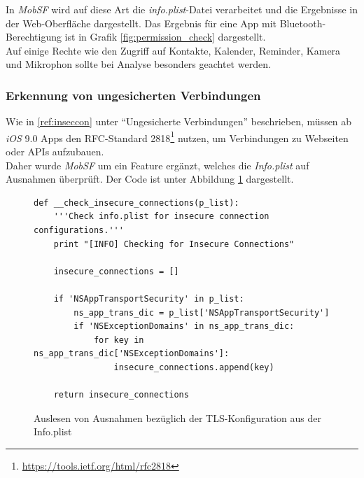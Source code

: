\pagebreak
In \textit{MobSF} wird auf diese Art die \textit{info.plist}-Datei verarbeitet und die Ergebnisse in der Web-Oberfläche dargestellt. Das Ergebnis für eine App mit Bluetooth-Berechtigung ist in Grafik \ref{fig:permission_check} dargestellt.\\

Auf einige Rechte wie den Zugriff auf Kontakte, Kalender, Reminder, Kamera und Mikrophon sollte bei Analyse besonders geachtet werden.

\subsubsection{Erkennung von ungesicherten Verbindungen}\label{ref:WeitMobSFErkennungVonUngesichertenVerbindungen}
Wie in \ref{ref:inseccon} unter "`Ungesicherte Verbindungen"' beschrieben, müssen ab \textit{iOS} 9.0 Apps den  RFC-Standard 2818\footnote{\url{https://tools.ietf.org/html/rfc2818}} nutzen, um Verbindungen zu Webseiten oder APIs aufzubauen.\\

Daher wurde \textit{MobSF} um ein Feature ergänzt, welches die \textit{Info.plist} auf Ausnahmen überprüft. Der Code ist unter Abbildung \ref{lis:NSAppTransportSecurity} dargestellt.\\

\begin{figure}
	\begin{lstlisting}
def __check_insecure_connections(p_list):
    '''Check info.plist for insecure connection configurations.'''
    print "[INFO] Checking for Insecure Connections"

    insecure_connections = []

    if 'NSAppTransportSecurity' in p_list:
        ns_app_trans_dic = p_list['NSAppTransportSecurity']
        if 'NSExceptionDomains' in ns_app_trans_dic:
            for key in ns_app_trans_dic['NSExceptionDomains']:
                insecure_connections.append(key)

    return insecure_connections
	\end{lstlisting}
	\caption{Auslesen von Ausnahmen bezüglich der TLS-Konfiguration aus der Info.plist}
	\label{lis:NSAppTransportSecurity}
\end{figure}

